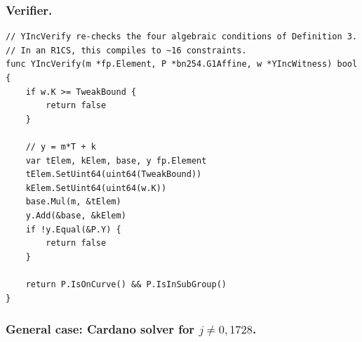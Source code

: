 \documentclass[11pt,a4paper]{article}
\theoremstyle{definition}
\begin{document}
\subsubsection*{Verifier.}

\begin{lstlisting}[caption={y-increment verifier: only four simple
checks, no residuosity chain.}, label={lst:y-inc-verify}]
// YIncVerify re-checks the four algebraic conditions of Definition 3.
// In an R1CS, this compiles to ~16 constraints.
func YIncVerify(m *fp.Element, P *bn254.G1Affine, w *YIncWitness) bool {
    if w.K >= TweakBound {
        return false
    }

    // y = m*T + k
    var tElem, kElem, base, y fp.Element
    tElem.SetUint64(uint64(TweakBound))
    kElem.SetUint64(uint64(w.K))
    base.Mul(m, &tElem)
    y.Add(&base, &kElem)
    if !y.Equal(&P.Y) {
        return false
    }

    return P.IsOnCurve() && P.IsInSubGroup()
}
\end{lstlisting}

\subsubsection*{General case: Cardano solver for $j \ne 0, 1728$.}
\end{document}
